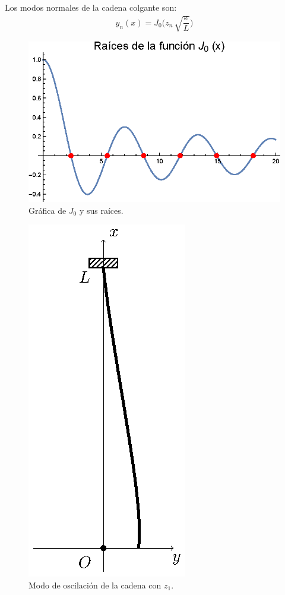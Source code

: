 Los modos normales de la cadena colgante son:
\begin{align}
y_{n} (x) = J_{0} \bigg( z_{n} \, \sqrt{\dfrac{x}{L}} \bigg)
\label{eq:ecuacion_28}
\end{align}
\begin{figure}[H]
    \centering
    \includegraphics[scale=1.2]{Imagenes/Plot_Bessel_Cadena_01_Raices_J0.eps}
    \caption{Gráfica de $J_{0}$ y sus raíces.}
    \label{fig:figura_raices_J0}
\end{figure}
\begin{figure}[H]
    \centering
    \includegraphics[scale=1.5]{Imagenes/Cadena_Oscilante_03.eps}
    \caption{Modo de oscilación de la cadena con $z_{1}$.}
\end{figure}
